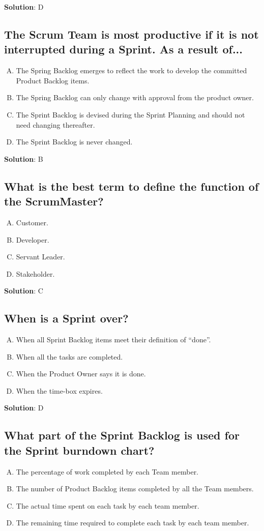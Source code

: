 \textbf{Solution}: D


\subsection{The Scrum Team is most productive if it is not interrupted during a Sprint. As a result of...}
\begin{enumerate}[A)]
  \item The Spring Backlog emerges to reflect the work to develop the committed Product Backlog items.
  \item The Spring Backlog can only change with approval from the product owner.
  \item The Sprint Backlog is devised during the Sprint Planning and should not need changing thereafter.
  \item The Sprint Backlog is never changed.
\end{enumerate}


\textbf{Solution}: B


\subsection{What is the best term to define the function of the ScrumMaster?}
\begin{enumerate}[A)]
  \item Customer.
  \item Developer.
  \item Servant Leader.
  \item Stakeholder.
\end{enumerate}


\textbf{Solution}: C


\subsection{When is a Sprint over?}
\begin{enumerate}[A)]
  \item When all Sprint Backlog items meet their definition of \enquote{done}.
  \item When all the tasks are completed.
  \item When the Product Owner says it is done.
  \item When the time-box expires.
\end{enumerate}

\textbf{Solution}: D


\subsection{What part of the Sprint Backlog is used for the Sprint burndown chart?}
\begin{enumerate}[A)]
  \item The percentage of work completed by each Team member.
  \item The number of Product Backlog items completed by all the Team members.
  \item The actual time spent on each task by each team member.
  \item The remaining time required to complete each task by each team member.
\end{enumerate}

